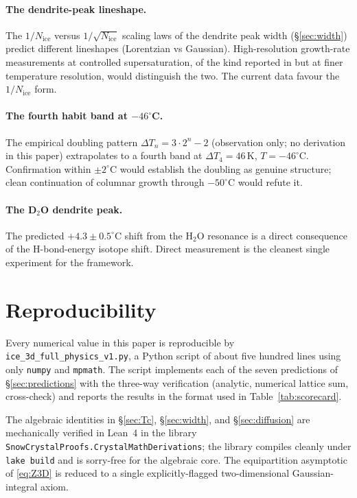 \documentclass[final]{siamltex}
\newcommand{\Nrule}{N_{\mathrm{ice}}}
\begin{document}
\paragraph{The dendrite-peak lineshape.}  The $1/\Nrule$ versus
$1/\sqrt{\Nrule}$ scaling laws of the dendrite peak width
(\S\ref{sec:width}) predict different lineshapes (Lorentzian vs
Gaussian).  High-resolution growth-rate measurements at controlled
supersaturation, of the kind reported in \cite{Libbrecht2005} but
at finer temperature resolution, would distinguish the two.  The
current data favour the $1/\Nrule$ form.

\paragraph{The fourth habit band at $-46^{\circ}$C.}  The
empirical doubling pattern $\Delta T_n = 3\cdot 2^n - 2$
(observation only; no derivation in this paper) extrapolates to
a fourth band at $\Delta T_4 = 46$\,K, $T = -46^{\circ}$C.
Confirmation within $\pm 2^{\circ}$C would establish the doubling
as genuine structure; clean continuation of columnar growth
through $-50^{\circ}$C would refute it.

\paragraph{The D$_2$O dendrite peak.}  The predicted
$+4.3 \pm 0.5^{\circ}$C shift from the H$_2$O resonance is a
direct consequence of the H-bond-energy isotope shift.  Direct
measurement is the cleanest single experiment for the framework.

\section{Reproducibility}

Every numerical value in this paper is reproducible by
\texttt{ice\_3d\_full\_physics\_v1.py}, a Python script of about
five hundred lines using only \texttt{numpy} and \texttt{mpmath}.
The script implements each of the seven predictions of
\S\ref{sec:predictions} with the three-way verification
(analytic, numerical lattice sum, cross-check) and reports the
results in the format used in Table~\ref{tab:scorecard}.

The algebraic identities in \S\ref{sec:Tc}, \S\ref{sec:width}, and
\S\ref{sec:diffusion} are mechanically verified in Lean~4 in the
library \texttt{SnowCrystalProofs.CrystalMathDerivations}; the
library compiles cleanly under \texttt{lake build} and is
sorry-free for the algebraic core.  The equipartition asymptotic
of \eqref{eq:Z3D} is reduced to a single explicitly-flagged
two-dimensional Gaussian-integral axiom.



\end{document}
